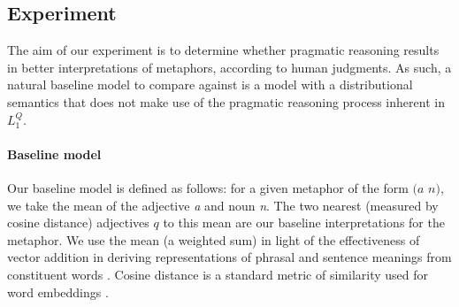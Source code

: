 \documentclass[9pt,twocolumn,twoside,lineno]{pnas-new}
\newcommand{\Listener}{L}
\newcommand{\QLONE}{\Listener_{{1}}^{{Q}}}
\begin{document}
{%



\subsection*{Experiment}

		The aim of our experiment is to determine whether pragmatic reasoning results in better interpretations of metaphors, according to human judgments. As such, a natural baseline model to compare against is a model with a distributional semantics that does not make use of the pragmatic reasoning process inherent in $\QLONE$.

		\paragraph{Baseline model}
		Our baseline model is defined as follows: for a given metaphor of the form $(a$ $n)$, we take the mean of the adjective \emph{a} and noun \emph{n}. The two nearest (measured by cosine distance) adjectives $q$ to this mean are our baseline interpretations for the metaphor. We use the mean (a weighted sum) in light of the effectiveness of vector addition in deriving representations of phrasal and sentence meanings from constituent words \cite{mitchell2010composition,grefenstette2013category,socher2013recursive}. Cosine distance is a standard metric of similarity used for word embeddings \cite{pennington2014glove}.



			





}
\end{document}
